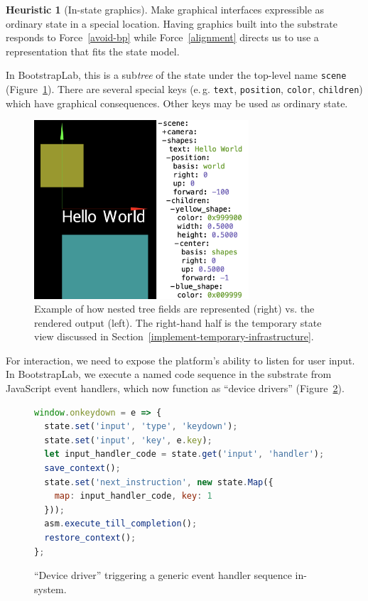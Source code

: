 \documentclass[ twoside,openright,titlepage,numbers=noenddot,headinclude,footinclude,cleardoublepage=empty,abstract=on,
                BCOR=5mm,paper=a4,fontsize=11pt
                ]{scrreprt}
\newcommand{\eg}{e.\,g.}
\theoremstyle{definition}
\newtheorem{heuristic}{Heuristic}
\begin{document}
\begin{heuristic}[In-state graphics]
\label{in-state-graphics}
Make graphical interfaces expressible as ordinary state in a special location. Having graphics built into the substrate responds to Force\ \ref{avoid-bp} while Force\ \ref{alignment} directs us to use a representation that fits the state model.
\end{heuristic}

In BootstrapLab, this is a sub\emph{tree} of the state under the
top-level name \texttt{scene} (Figure~\ref{fig:scene-tree}). There are
several special keys (\eg{} \texttt{text}, \texttt{position},
\texttt{color}, \texttt{children}) which have graphical consequences.
Other keys may be used as ordinary state.

\begin{figure}
\centering
\includegraphics[width=8cm]{scene-tree-example.png}
\caption[BootstrapLab scene tree]{Example of how nested tree fields are represented (right) vs. the rendered output (left). The right-hand half is the temporary state view discussed in Section\ \ref{implement-temporary-infrastructure}.}
\label{fig:scene-tree}
\end{figure}

For interaction, we need to expose the platform's ability to listen for
user input. In BootstrapLab, we execute a named code sequence in the
substrate from JavaScript event handlers, which now function as ``device
drivers'' (Figure~\ref{lst:devdrv}).

\begin{figure}
\begin{lstlisting}[language=JavaScript]
window.onkeydown = e => {
  state.set('input', 'type', 'keydown');
  state.set('input', 'key', e.key);
  let input_handler_code = state.get('input', 'handler');
  save_context();
  state.set('next_instruction', new state.Map({
    map: input_handler_code, key: 1
  }));
  asm.execute_till_completion();
  restore_context();
};
\end{lstlisting}
\caption[BootstrapLab ``device driver'' for \acs{DOM} events]{``Device driver'' triggering a generic event handler sequence in-system.}
\label{lst:devdrv}
\end{figure}
\end{document}
